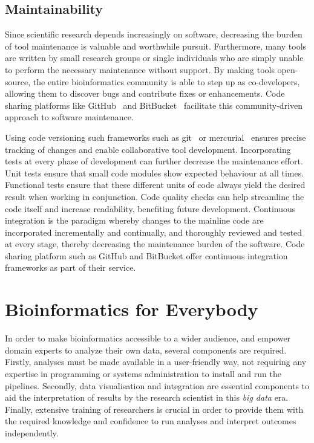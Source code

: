 \begin{justify}
\subsection{Maintainability}
Since scientific research depends increasingly on software, decreasing the burden of tool maintenance is valuable and worthwhile pursuit. Furthermore, many tools are written by small research groups or single individuals who are simply unable to perform the necessary maintenance without support. By making tools open-source, the entire bioinformatics community is able to step up as co-developers, allowing them to discover bugs and contribute fixes or enhancements. Code sharing platforms like GitHub~\cite{url-github} and BitBucket~\cite{url-bitbucket} facilitate this community-driven approach to software maintenance.

Using code versioning such frameworks such as git~\cite{url-git} or mercurial~\cite{url-mercurial} ensures precise tracking of changes and enable collaborative tool development. Incorporating tests at every phase of development can further decrease the maintenance effort. Unit tests ensure that small code modules show expected behaviour at all times. Functional tests ensure that these different units of code always yield the desired result when working in conjunction. Code quality checks can help streamline the code itself and increase readability, benefiting future development. Continuous integration is the paradigm whereby changes to the mainline code are incorporated incrementally and continually, and thoroughly reviewed and tested at every stage, thereby decreasing the maintenance burden of the software. Code sharing platform such as GitHub and BitBucket offer continuous integration frameworks as part of their service.



\section{Bioinformatics for Everybody}

In order to make bioinformatics accessible to a wider audience, and empower domain experts to analyze their own data, several components are required. Firstly, analyses must be made available in a user-friendly way, not requiring any expertise in programming or systems administration to install and run the pipelines. Secondly, data visualisation and integration are essential components to aid the interpretation of results by the research scientist in this \emph{big data} era. Finally, extensive training of researchers is crucial in order to provide them with the required knowledge and confidence to run analyses and interpret outcomes independently.


\end{justify}
